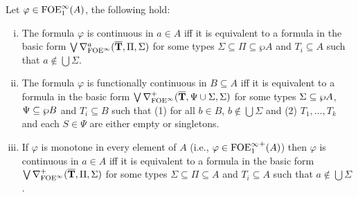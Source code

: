 \begin{corollary}\label{cor:ofoeicontinuousnf}
Let $\varphi \in \ofoei(A)$, the following hold:
	\begin{enumerate}[(i)]
		\item The formula $\varphi$ is continuous in $a \in A$ iff it is equivalent to a formula in the basic form $\bigvee \mondbnfofoei{\vlist{T}}{\Pi}{\Sigma}{a}$ for some types $\Sigma\subseteq\Pi \subseteq \wp A$ and $T_i \subseteq A$ such that $a\notin \bigcup\Sigma$. 	\label{pt:ofoeifcontinuous}	%
				\item The formula $\varphi$ is functionally continuous in $B \subseteq A$ iff it is equivalent to a formula in the basic form $\bigvee \mondbnfofoei{\vlist{T}}{\Psi \cup \Sigma}{\Sigma}{+}$ for some types $\Sigma\subseteq \pw A$, $\Psi \subseteq \pw B$ and $T_i \subseteq B$ such that (1) for all $b \in B$, $b\notin \bigcup\Sigma$ and (2) $T_1,\dots,T_k$ and each $S \in \Psi$ are either empty or singletons. 	\label{pt:ofoeifunctionalcontinuous}	%
		\item If $\varphi$ is monotone in every element of $A$ (i.e., $\varphi\in{\ofoei}^+(A)$) then $\varphi$ is continuous in $a \in A$ iff it is equivalent to a formula in the basic form $\bigvee \posdbnfofoei{\vlist{T}}{\Pi}{\Sigma}$ for some types $\Sigma\subseteq\Pi \subseteq A$ and $T_i \subseteq A$ such that $a\notin \bigcup\Sigma$. \label{pt:ofoeimonotone}
	\end{enumerate}
\end{corollary}
